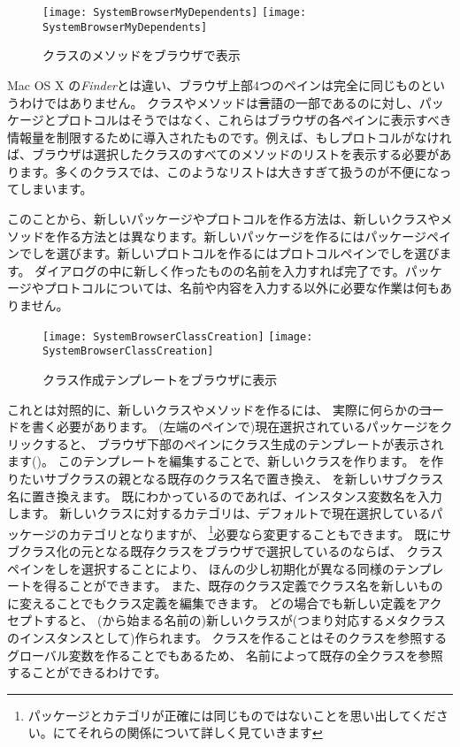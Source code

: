 \documentclass[a4paper,10pt,twoside]{book}
\begin{document}
\begin{figure}[htbp]
   \centering
   \ifluluelse
{\texttt{[image: SystemBrowserMyDependents]}}
{\texttt{[image: SystemBrowserMyDependents]}}
   \caption{クラスのメソッドをブラウザで表示
   }
\end{figure}

Mac OS X の\emph{Finder}とは違い、ブラウザ上部4つのペインは完全に同じものというわけではありません。
クラスやメソッドは\st 言語の一部であるのに対し、パッケージとプロトコルはそうではなく、これらはブラウザの各ペインに表示すべき情報量を制限するために導入されたものです。例えば、もしプロトコルがなければ、ブラウザは選択したクラスのすべてのメソッドのリストを表示する必要があります。多くのクラスでは、このようなリストは大きすぎて扱うのが不便になってしまいます。

このことから、新しいパッケージやプロトコルを作る方法は、新しいクラスやメソッドを作る方法とは異なります。新しいパッケージを作るにはパッケージペインで\actclick しを選びます。新しいプロトコルを作るにはプロトコルペインで\actclick しを選びます。
ダイアログの中に新しく作ったものの名前を入力すれば完了です。パッケージやプロトコルについては、名前や内容を入力する以外に必要な作業は何もありません。

\begin{figure}[htbp]
   \centering
   \ifluluelse
{\texttt{[image: SystemBrowserClassCreation]}}
{\texttt{[image: SystemBrowserClassCreation]}}
   \caption{クラス作成テンプレートをブラウザに表示
   }
\end{figure}

これとは対照的に、新しいクラスやメソッドを作るには、
実際に何らかの\st コードを書く必要があります。
(左端のペインで)現在選択されているパッケージをクリックすると、
ブラウザ下部のペインにクラス生成のテンプレートが表示されます()。
このテンプレートを編集することで、新しいクラスを作ります。
を作りたいサブクラスの親となる既存のクラス名で置き換え、
を新しいサブクラス名に置き換えます。
既にわかっているのであれば、インスタンス変数名を入力します。
新しいクラスに対するカテゴリは、デフォルトで現在選択しているパッケージのカテゴリとなりますが、
\footnote{パッケージとカテゴリが正確には同じものではないことを思い出してください。にてそれらの関係について詳しく見ていきます}必要なら変更することもできます。
既にサブクラス化の元となる既存クラスをブラウザで選択しているのならば、
クラスペインを\actclick しを選択することにより、
ほんの少し初期化が異なる同様のテンプレートを得ることができます。
また、既存のクラス定義でクラス名を新しいものに変えることでもクラス定義を編集できます。
どの場合でも新しい定義をアクセプトすると、
(\ct{#}から始まる名前の)新しいクラスが(つまり対応するメタクラスのインスタンスとして)作られます。
クラスを作ることはそのクラスを参照するグローバル変数を作ることでもあるため、
名前によって既存の全クラスを参照することができるわけです。
\end{document}
